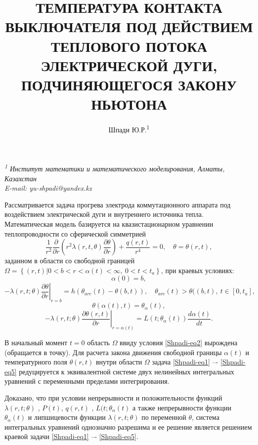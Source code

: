 \documentclass[12pt]{article}
\title{ТЕМПЕРАТУРА КОНТАКТА ВЫКЛЮЧАТЕЛЯ ПОД ДЕЙСТВИЕМ ТЕПЛОВОГО ПОТОКА ЭЛЕКТРИЧЕСКОЙ ДУГИ, ПОДЧИНЯЮЩЕГОСЯ ЗАКОНУ НЬЮТОНА}
\author{Шпади Ю.Р.\textsuperscript{1}} %
\date{}
\makeatletter
\renewcommand{\maketitle}{%
    \begin{center}
        \Large\@title

        \vspace{0.4cm}
        \large\@author

        \vspace{0.5cm}
        \normalsize\textit{\textsuperscript{1} Институт математики и математического моделирования, Алматы, Казахстан\\
          E-mail: yu-shpadi@yandex.kz\\}
    \end{center}
}
\makeatother
\begin{document}
\maketitle

Рассматривается задача прогрева электрода коммутационного аппарата под воздействием электрической дуги и внутреннего источника тепла. Математическая модель базируется на квазистационарном уравнении теплопроводности со сферической симметрией 
\begin{equation}\label{Shpadi-eq1}
\frac{1}{r^2}\frac{\partial}{\partial {r}}\left(r^2 \lambda(r,t,\theta)\frac{\partial {\theta}}{\partial{r}}\right) +\frac{q(r,t)}{r^4} = 0,\quad \theta = \theta(r,t),     
\end{equation}
заданном в области со свободной границей $\Omega = \left\{ (r,t) | 0<b<r<\alpha(t) < \infty, \ 0<t<t_a \right\}$, при краевых условиях:
\begin{equation}\label{Shpadi-eq2}
  \alpha(0) = b,
\end{equation}
\begin{equation}\label{Shpadi-eq3}
  -\left. \lambda(r,t;\theta) \frac{\partial \theta}{\partial r} \right|_{r=b}  = h\left(\theta_{arc}(t)-\theta(b,t)\right),
  \quad \theta_{arc}(t) > \theta((b,t), \ t\in[0,t_a],
\end{equation}
\begin{equation}\label{Shpadi-eq4}
  \theta(\alpha(t),t) = \theta_{\alpha} (t),
\end{equation}
\begin{equation}\label{Shpadi-eq5}
  -\left. \lambda(r,t;\theta) \frac{\partial \theta(r,t)}{\partial {r}} \right|_{r=\alpha(t)} = L(t;\theta_{\alpha} (t)) \frac{d \alpha(t)}{d t}.
\end{equation}

В начальный момент $t=0$ область $\Omega$ ввиду условия \eqref{Shpadi-eq2} вырождена (обращается в точку).  Для расчета закона движения свободной границы $\alpha(t)$  и температурного поля $\theta(r,t)$  внутри области  $\Omega$  задача \eqref{Shpadi-eq1} –- \eqref{Shpadi-eq5} редуцируется к эквивалентной системе двух нелинейных интегральных уравнений с переменными пределами интегрирования.     

Доказано, что при условии непрерывности и положительности функций $\lambda(r,t;\theta)$ , $P(t)$, $q(r,t)$ , $L(t;\theta_{\alpha}(t)$ а также непрерывности функции $\theta_{\alpha}(t)$  и липшицевости функции $\lambda(r,t;\theta)$  по переменной $\theta$, система интегральных уравнений однозначно разрешима и ее решение является решением краевой задачи \eqref{Shpadi-eq1} –- \eqref{Shpadi-eq5}. 
\end{document}
